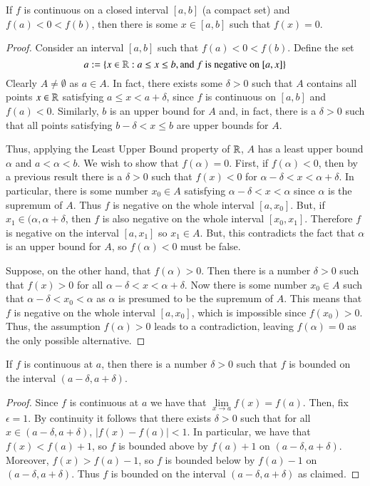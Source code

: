 \begin{thm}
    If $f$ is continuous on a closed interval $[a,b]$ (a compact set) and $f(a) < 0 < f(b)$, then there is some $x \in [a,b]$ such that $f(x) = 0$.
\end{thm}
\begin{proof}
    Consider an interval $[a,b]$ such that $f(a) < 0 < f(b)$. Define the set $$a := \{x\in \mathbb R:a\leq x \leq b,\text{and $f$ is negative on $[a,x]$}\}$$
    Clearly $A \neq \emptyset$ as $a \in A$. In fact, there exists some $\delta > 0$ such that $A$ contains all points $x \in \mathbb R$ satisfying $a \leq x < a+\delta$, since $f$ is continuous on $[a,b]$ and $f(a) < 0$. Similarly, $b$ is an upper bound for $A$ and, in fact, there is a $\delta > 0$ such that all points satisfying $b-\delta < x \leq b$ are upper bounds for $A$.

    Thus, applying the Least Upper Bound property of $\mathbb R$, $A$ has a least upper bound $\alpha$ and $a<\alpha < b$. We wish to show that $f(\alpha) = 0$. First, if $f(\alpha) < 0$, then by a previous result there is a $\delta > 0$ such that $f(x) < 0$ for $\alpha - \delta < x < \alpha + \delta$. In particular, there is some number $x_0 \in A$ satisfying $\alpha - \delta < x < \alpha$ since $\alpha$ is the supremum of $A$. Thus $f$ is negative on the whole interval $[a,x_0]$. But, if $x_1 \in (\alpha, \alpha+\delta$, then $f$ is also negative on the whole interval $[x_0,x_1]$. Therefore $f$ is negative on the interval $[a,x_1]$ so $x_1 \in A$. But, this contradicts the fact that $\alpha$ is an upper bound for $A$, so $f(\alpha) < 0$ must be false.


    Suppose, on the other hand, that $f(\alpha) > 0$. Then there is a number $\delta > 0$ such that $f(x) > 0$ for all $\alpha - \delta < x < \alpha + \delta$. Now there is some number $x_0 \in A$ such that $\alpha - \delta < x_0 < \alpha$ as $\alpha$ is presumed to be the supremum of $A$. This means that $f$ is negative on the whole interval $[a,x_0]$, which is impossible since $f(x_0) > 0$. Thus, the assumption $f(\alpha) > 0$ leads to a contradiction, leaving $f(\alpha) = 0$ as the only possible alternative. 
\end{proof}

\begin{lem}
    If $f$ is continuous at $a$, then there is a number $\delta > 0$ such that $f$ is bounded on the interval $(a-\delta, a+\delta)$.
\end{lem}
\begin{proof}
    Since $f$ is continuous at $a$ we have that $\lim\limits_{x\rightarrow a}f(x) = f(a)$. Then, fix $\epsilon = 1$. By continuity it follows that there exists $\delta > 0$ such that for all $x \in (a-\delta, a+\delta)$, $|f(x) - f(a)| < 1$. In particular, we have that $f(x) < f(a) + 1$, so $f$ is bounded above by $f(a)+1$ on $(a-\delta,a+\delta)$. Moreover, $f(x) > f(a) - 1$, so $f$ is bounded below by $f(a) -1$ on $(a-\delta, a+\delta)$. Thus $f$ is bounded on the interval $(a-\delta,a+\delta)$ as claimed.
\end{proof}


